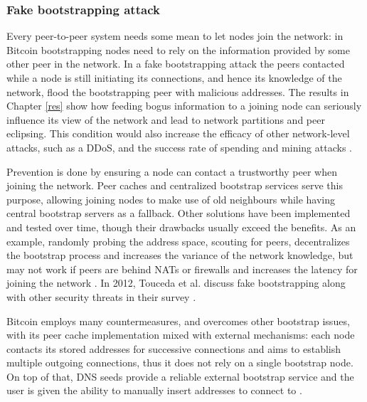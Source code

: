\documentclass[12pt, letterpaper, twoside]{article}
\begin{document}
\subsubsection{Fake bootstrapping attack}\label{fakeboot}
Every peer-to-peer system needs some mean to let nodes join the network: in Bitcoin bootstrapping nodes need to rely on the information provided by some other peer in the network. In a fake bootstrapping attack the peers contacted while a node is still initiating its connections, and hence its knowledge of the network, flood the bootstrapping peer with malicious addresses. The results in Chapter \ref{res} show how feeding bogus information to a joining node can seriously influence its view of the network and lead to network partitions and peer eclipsing. This condition would also increase the efficacy of other network-level attacks, such as a DDoS, and the success rate of spending and mining attacks \cite{eclipseatk}.

Prevention is done by ensuring a node can contact a trustworthy peer when joining the network. Peer caches and centralized bootstrap services serve this purpose, allowing joining nodes to make use of old neighbours while having central bootstrap servers as a fallback. Other solutions have been implemented and tested over time, though their drawbacks usually exceed the benefits. As an example, randomly probing the address space, scouting for peers, decentralizes the bootstrap process and increases the variance of the network knowledge, but may not work if peers are behind NATs or firewalls and increases the latency for joining the network \cite{decentrbootstrapp2p} \cite{localityaware}. In 2012,  Touceda et al. discuss fake bootstrapping along with other security threats in their survey \cite{toucedafakeboot}.

Bitcoin employs many countermeasures, and overcomes other bootstrap issues, with its peer cache implementation mixed with external mechanisms: each node contacts its stored addresses for successive connections and aims to establish multiple outgoing connections, thus it does not rely on a single bootstrap node. On top of that, DNS seeds provide a reliable external bootstrap service and the user is given the ability to manually insert addresses to connect to \cite{mahmoud_netsec_boot}.
\end{document}
